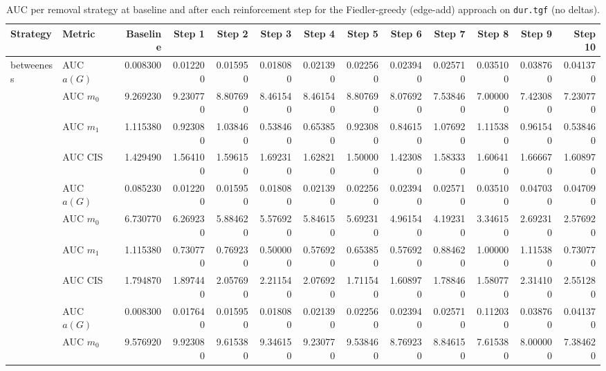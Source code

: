 \begin{table}[htbp]
  \centering
  \caption{AUC per removal strategy at baseline and after each reinforcement step for the Fiedler-greedy (edge-add) approach on \texttt{dur.tgf} (no deltas).}
  \label{tab:dur-fiedler_greedy-auc}
\setlength{\tabcolsep}{2.5pt}
  \begin{tabular}{llrrrrrrrrrrr}
    \toprule
    \textbf{Strategy} & \textbf{Metric} & \textbf{Baseline} & \textbf{Step 1} & \textbf{Step 2} & \textbf{Step 3} & \textbf{Step 4} & \textbf{Step 5} & \textbf{Step 6} & \textbf{Step 7} & \textbf{Step 8} & \textbf{Step 9} & \textbf{Step 10} \\
    \midrule
    \multirow{4}{*}{betweeness} & AUC $a(G)$ & 0.008300 & 0.012200 & 0.015950 & 0.018080 & 0.021390 & 0.022560 & 0.023940 & 0.025710 & 0.035100 & 0.038760 & 0.041370 \\
    & AUC $m_0$ & 9.269230 & 9.230770 & 8.807690 & 8.461540 & 8.461540 & 8.807690 & 8.076920 & 7.538460 & 7.000000 & 7.423080 & 7.230770 \\
    & AUC $m_1$ & 1.115380 & 0.923080 & 1.038460 & 0.538460 & 0.653850 & 0.923080 & 0.846150 & 1.076920 & 1.115380 & 0.961540 & 0.538460 \\
    & AUC CIS & 1.429490 & 1.564100 & 1.596150 & 1.692310 & 1.628210 & 1.500000 & 1.423080 & 1.583330 & 1.606410 & 1.666670 & 1.608970 \\
    \addlinespace
    \multirow{4}{*}{closeness} & AUC $a(G)$ & 0.085230 & 0.012200 & 0.015950 & 0.018080 & 0.021390 & 0.022560 & 0.023940 & 0.025710 & 0.035100 & 0.047030 & 0.047090 \\
    & AUC $m_0$ & 6.730770 & 6.269230 & 5.884620 & 5.576920 & 5.846150 & 5.692310 & 4.961540 & 4.192310 & 3.346150 & 2.692310 & 2.576920 \\
    & AUC $m_1$ & 1.115380 & 0.730770 & 0.769230 & 0.500000 & 0.576920 & 0.653850 & 0.576920 & 0.884620 & 1.000000 & 1.115380 & 0.730770 \\
    & AUC CIS & 1.794870 & 1.897440 & 2.057690 & 2.211540 & 2.076920 & 1.711540 & 1.608970 & 1.788460 & 1.580770 & 2.314100 & 2.551280 \\
    \addlinespace
    \multirow{4}{*}{core influence} & AUC $a(G)$ & 0.008300 & 0.017640 & 0.015950 & 0.018080 & 0.021390 & 0.022560 & 0.023940 & 0.025710 & 0.112030 & 0.038760 & 0.041370 \\
    & AUC $m_0$ & 9.576920 & 9.923080 & 9.615380 & 9.346150 & 9.230770 & 9.538460 & 8.769230 & 8.846150 & 7.615380 & 8.000000 & 7.384620 \\

\end{tabular}
\end{table}
